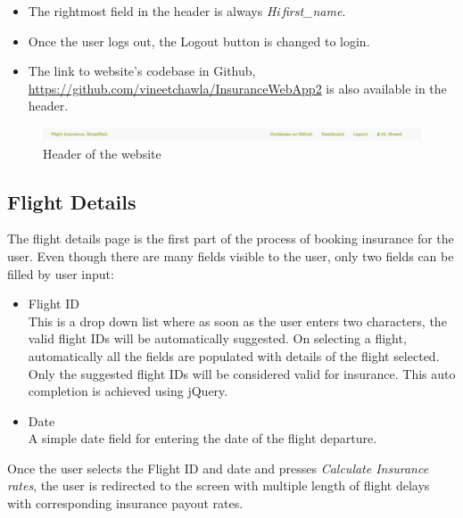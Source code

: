 \begin{itemize}
    \item The rightmost field in the header is always \textit{Hi\,first\_name}.
    \item Once the user logs out, the Logout button is changed to login.
    \item The link to website's codebase in Github, \url{https://github.com/vineetchawla/InsuranceWebApp2} is also available in the header.
\end{itemize}

\begin{figure}[h]
    \centering
    \includegraphics[width=\textwidth]{Figures/header.png}
    \caption{Header of the website}
    \label{fig:header}
\end{figure}

\subsection{Flight Details}
The flight details page is the first part of the process of booking insurance for the user. Even though there are many fields visible to the user, only two fields can be filled by user input:
\begin{itemize}
    \item Flight ID
    \\This is a drop down list where as soon as the user enters two characters, the valid flight IDs will be automatically suggested. On selecting a flight, automatically all the fields are populated with details of the flight selected. Only the suggested flight IDs will be considered valid for insurance. This auto completion is achieved using jQuery.
    \item Date
    \\ A simple date field for entering the date of the flight departure.
\end{itemize}
Once the user selects the Flight ID and date and presses \textit{Calculate Insurance rates}, the user is redirected to the screen with multiple length of flight delays with corresponding insurance payout rates.

